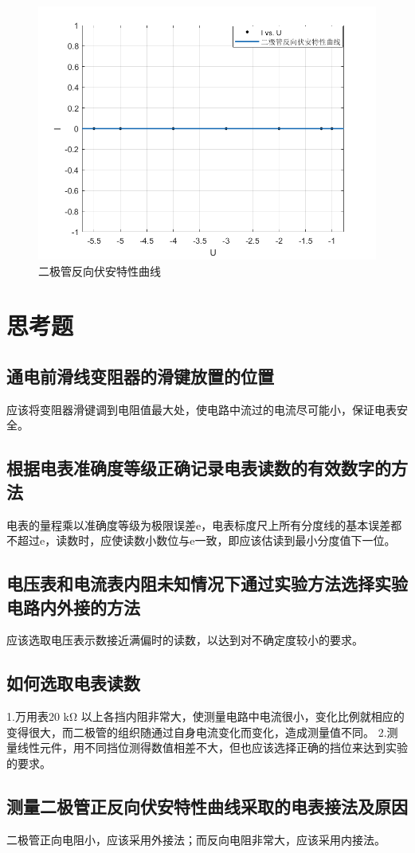 \documentclass[UTF8]{ctexart}
\begin{document}
\begin{figure}[H]
    \centering
    \caption*{二极管反向伏安特性曲线}
    \includegraphics[width=0.5\linewidth]{img/二极管反向伏安特性曲线.png}
\end{figure}


\newpage

\section{思考题}

\subsection{通电前滑线变阻器的滑键放置的位置}
应该将变阻器滑键调到电阻值最大处，使电路中流过的电流尽可能小，保证电表安全。


\subsection{根据电表准确度等级正确记录电表读数的有效数字的方法}
电表的量程乘以准确度等级为极限误差e，电表标度尺上所有分度线的基本误差都不超过e，读数时，应使读数小数位与e一致，即应该估读到最小分度值下一位。


\subsection{电压表和电流表内阻未知情况下通过实验方法选择实验电路内外接的方法}
应该选取电压表示数接近满偏时的读数，以达到对不确定度较小的要求。


\subsection{如何选取电表读数}
1.万用表20 kΩ 以上各挡内阻非常大，使测量电路中电流很小，变化比例就相应的变得很大，而二极管的组织随通过自身电流变化而变化，造成测量值不同。
2.测量线性元件，用不同挡位测得数值相差不大，但也应该选择正确的挡位来达到实验的要求。


\subsection{测量二极管正反向伏安特性曲线采取的电表接法及原因}
二极管正向电阻小，应该采用外接法；而反向电阻非常大，应该采用内接法。
\end{document}
